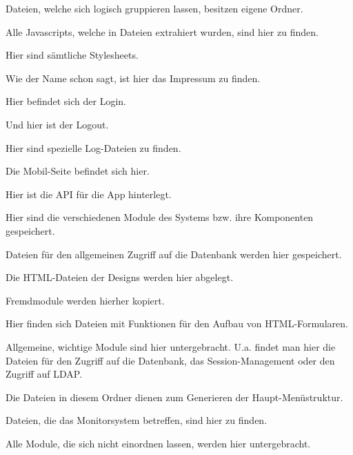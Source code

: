 \begin{description}[style=nextline]
\begin{description}[style=nextline]
					Dateien, welche sich logisch gruppieren lassen, besitzen eigene Ordner.
				\item[./scripts/]
					Alle Javascripts, welche in Dateien extrahiert wurden, sind hier zu finden.
				\item[./styles/]
					Hier sind sämtliche Stylesheets.	
			\end{description}
		\item[/impressum/]
			Wie der Name schon sagt, ist hier das Impressum zu finden.
		\item[/login/]
			Hier befindet sich der Login.
		\item[/logout/]
			Und hier ist der Logout.
		\item[/logs/]
			Hier sind spezielle Log-Dateien zu finden.
		\item[/mobile/]
			Die Mobil-Seite befindet sich hier.
			\begin{description}[style=nextline]
				\item[./api/]
					Hier ist die API für die App hinterlegt.
			\end{description}
		\item[/modules/]
			Hier sind die verschiedenen Module des Systems bzw. ihre Komponenten  gespeichert.
			\begin{description}[style=nextline]
				\item[./datebase/]
					Dateien für den allgemeinen Zugriff auf die Datenbank werden hier gespeichert.
				\item[./design/]
					Die HTML-Dateien der Designs werden hier abgelegt.
				\item[./external/]
					Fremdmodule werden hierher kopiert.
				\item[./form/]
					Hier finden sich Dateien mit Funktionen für den Aufbau von HTML-Formularen.
				\item[./general/]
					Allgemeine, wichtige Module sind hier untergebracht. U.a. findet man hier die Dateien für den Zugriff auf die Datenbank, das Session-Management oder den Zugriff auf LDAP.
				\item[./menu/]
					Die Dateien in diesem Ordner dienen zum Generieren der Haupt-Menüstruktur.
				\item[./monitors/]
					Dateien, die das Monitorsystem betreffen, sind hier zu finden.
				\item[./other/]
					Alle Module, die sich nicht einordnen lassen, werden hier untergebracht.
			\end{description}
		\item[/monitors/]

\end{description}
